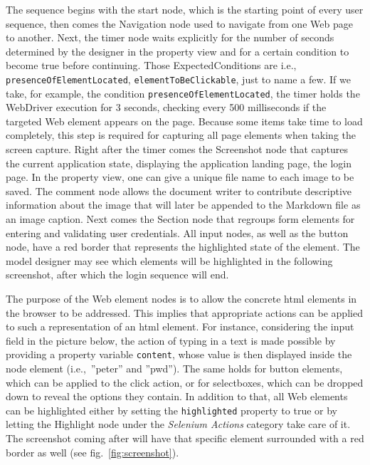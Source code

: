 The sequence begins with the start node, which is the starting point of every user sequence, then comes the Navigation node used to navigate from one Web page to another. Next, the timer node waits explicitly for the number of seconds determined by the designer in the property view and for a certain condition to become true before continuing. Those ExpectedConditions are i.e., \lstinline{presenceOfElementLocated}, \lstinline{elementToBeClickable}, just to name a few. If we take, for example, the condition \lstinline{presenceOfElementLocated}, the timer holds the WebDriver execution for 3 seconds, checking every 500 milliseconds if the targeted Web element appears on the page. Because some items take time to load completely, this step is required for capturing all page elements when taking the screen capture. Right after the timer comes the Screenshot node that captures the current application state, displaying the application landing page, the login page. In the property view, one can give a unique file name to each image to be saved. The comment node allows the document writer to contribute descriptive information about the image that will later be appended to the Markdown file as an image caption. Next comes the Section node that regroups form elements for entering and validating user credentials. All input nodes, as well as the button node, have a red border that represents the highlighted state of the element. The model designer may see which elements will be highlighted in the following screenshot, after which the login sequence will end. 

The purpose of the Web element nodes is to allow the concrete \gls*{html} elements in the browser to be addressed. This implies that appropriate actions can be applied to such a representation of an \gls*{html} element. For instance, considering the input field in the picture below, the action of typing in a text is made possible by providing a property variable \lstinline{content}, whose value is then displayed inside the node element (i.e.,~''peter'' and ''pwd''). The same holds for button elements, which can be applied to the click action, or for selectboxes, which can be dropped down to reveal the options they contain. In addition to that, all Web elements can be highlighted either by setting the \lstinline{highlighted} property to true or by letting the Highlight node under the \textit{Selenium Actions} category take care of it. The screenshot coming after will have that specific element surrounded with a red border as well (see fig.~\ref{fig:screenshot}).


